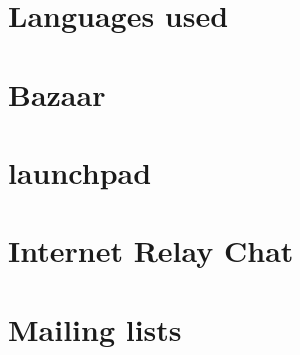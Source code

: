 \section{Languages used}
\section{Bazaar}
\section{launchpad}
\section{Internet Relay Chat}
\section{Mailing lists}